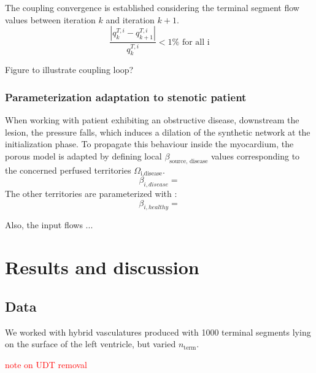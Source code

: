 \documentclass[journal]{IEEEtran}
\newcommand{\joinus}[2]{\ensuremath{#1_{\text{#2}}}}
\newcommand{\clcg}[1]{\textcolor{red}{#1}}
\begin{document}
The coupling convergence is established considering the terminal segment flow values between iteration $k$ and iteration $k+1$. 
\begin{equation}
\frac{\left\lvert q^{T,i}_{k} - q^{T,i}_{k+1} \right\rvert}{q^{T,i}_k} < 1 \% \text{ for all i}
\end{equation}

Figure to illustrate coupling loop?



%

\subsubsection{Parameterization adaptation to stenotic patient}
When working with patient exhibiting an obstructive disease, downstream the lesion, the pressure falls, which induces a dilation of the synthetic network at the initialization phase. To propagate this behaviour inside the myocardium, the porous model is adapted by defining local \joinus{\beta}{source, disease} values corresponding to the concerned perfused territories \joinus{\Omega}{i,disease}.
\begin{equation}
\beta_{i, disease} = 
\end{equation}
The other territories are parameterized with :
\begin{equation}
\beta_{i, healthy} =
\end{equation}

Also, the input flows ...

\section{Results and discussion}

\subsection{Data}
We worked with hybrid vasculatures produced with 1000 terminal segments lying on the surface of the left ventricle, but varied \joinus{n}{term}.

\clcg{note on UDT removal}
\end{document}
